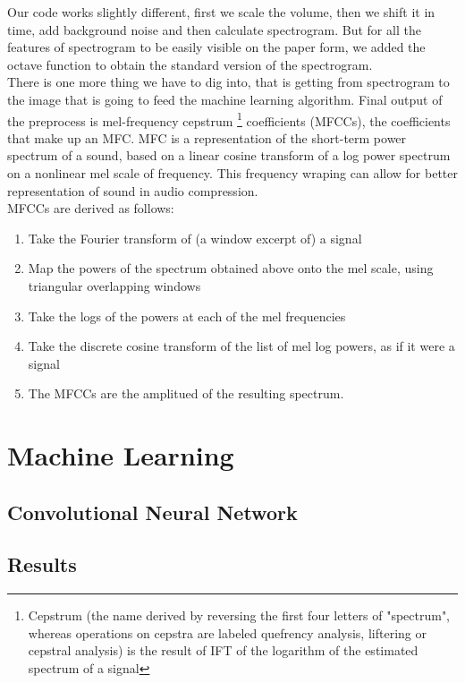 \documentclass[twoside]{article}
\begin{document}
\begin{multicols}{2}
Our code works slightly different, first we scale the volume, then we shift it in time, add background noise and then calculate spectrogram. But for all the features of spectrogram to be easily visible on the paper form, we added the octave function to obtain the standard version of the spectrogram.\\
There is one more thing we have to dig into, that is getting from spectrogram to the image that is going to feed the machine learning algorithm. Final output of the preprocess is mel-frequency cepstrum \footnote{Cepstrum (the name derived by reversing the first four letters of "spectrum", whereas operations on cepstra are labeled quefrency analysis, liftering or cepstral analysis) is the result of IFT of the logarithm of the estimated spectrum of a signal} coefficients (MFCCs), the coefficients that make up an MFC. MFC is a representation of the short-term power spectrum of a sound, based on a linear cosine transform of a log power spectrum on a nonlinear mel scale of frequency. This frequency wraping can allow for better representation of sound in audio compression. \\
MFCCs are derived as follows:
\begin{enumerate}
	\item Take the Fourier transform of (a window excerpt of) a signal
	\item Map the powers of the spectrum obtained above onto the mel scale, using triangular overlapping windows
	\item Take the logs of the powers at each of the mel frequencies
	\item Take the discrete cosine transform of the list of mel log powers, as if it were a signal
	\item The MFCCs are the amplitued of the resulting spectrum.
\end{enumerate}
\section{Machine Learning}

\subsection{Convolutional Neural Network}

\subsection{Results}


\end{multicols}
\end{document}
